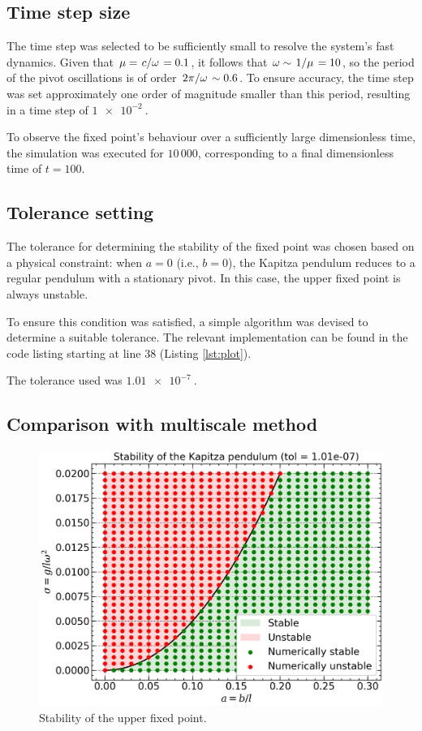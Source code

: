 \subsection{Time step size}

The time step was selected to be sufficiently small to resolve the system's fast dynamics. Given that $\mu = \flatfrac{c}{\omega} = 0.1$, it follows that $\omega \sim \flatfrac{1}{\mu} = 10$, so the period of the pivot oscillations is of order $\flatfrac{2 \pi}{\omega} \sim 0.6$. To ensure accuracy, the time step was set approximately one order of magnitude smaller than this period, resulting in a time step of $\SI{1e-2}{}$.

To observe the fixed point's behaviour over a sufficiently large dimensionless time, the simulation was executed for $10\,000$, corresponding to a final dimensionless time of $t = 100$.


\subsection{Tolerance setting}
The tolerance for determining the stability of the fixed point was chosen based on a physical constraint: when $a = 0$ (i.e., $b = 0$), the Kapitza pendulum reduces to a regular pendulum with a stationary pivot. In this case, the upper fixed point is always unstable.

To ensure this condition was satisfied, a simple algorithm was devised to determine a suitable tolerance. The relevant implementation can be found in the code listing starting at line 38 (Listing \ref{lst:plot}).

The tolerance used was $\SI{1.01e-7}{}$.

\subsection{Comparison with multiscale method} \label{sec:com_anal_sol}

\begin{figure}[h]
    \centering
    \includegraphics[width=0.75\linewidth]{Images/stability_1.01e-07.png}
    \caption{Stability of the upper fixed point.}
    \label{fig:stability}
\end{figure}

